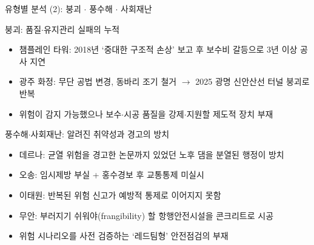 \documentclass[aspectratio=169,10pt]{beamer}
\begin{document}
\begin{frame}{유형별 분석 (2): 붕괴 $\cdot$ 풍수해 $\cdot$ 사회재난}
  \begin{block}{붕괴: 품질$\cdot$유지관리 실패의 누적}
    \small
    \begin{itemize}
      \item 챔플레인 타워: 2018년 `중대한 구조적 손상' 보고 후 보수비 갈등으로 3년 이상 공사 지연
      \item 광주 화정: 무단 공법 변경, 동바리 조기 철거 $\to$ 2025 광명 신안산선 터널 붕괴로 반복
      \item[$\Rightarrow$] 위험이 감지 가능했으나 보수$\cdot$시공 품질을 강제$\cdot$지원할 \alert{제도적 장치 부재}
    \end{itemize}
  \end{block}
  \begin{block}{풍수해$\cdot$사회재난: 알려진 취약성과 경고의 방치}
    \small
    \begin{itemize}
      \item 데르나: 균열 위험을 경고한 논문까지 있었던 노후 댐을 분열된 행정이 방치
      \item 오송: 임시제방 부실 + 홍수경보 후 교통통제 미실시
      \item 이태원: 반복된 위험 신고가 예방적 통제로 이어지지 못함
      \item 무안: 부러지기 쉬워야(frangibility) 할 항행안전시설을 콘크리트로 시공
      \item[$\Rightarrow$] 위험 시나리오를 사전 검증하는 \alert{`레드팀형' 안전점검}의 부재
    \end{itemize}
  \end{block}
\end{frame}
\end{document}
